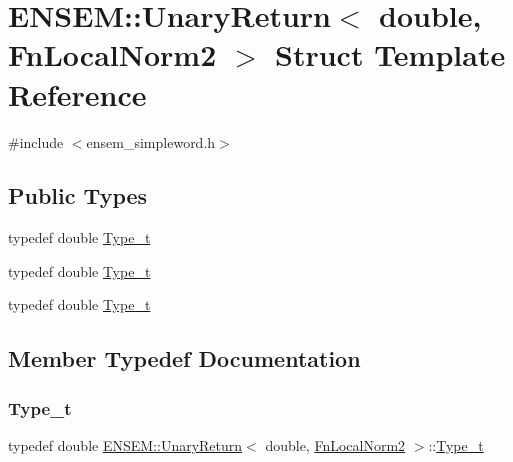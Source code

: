 \hypertarget{structENSEM_1_1UnaryReturn_3_01double_00_01FnLocalNorm2_01_4}{}\section{E\+N\+S\+EM\+:\+:Unary\+Return$<$ double, Fn\+Local\+Norm2 $>$ Struct Template Reference}
\label{structENSEM_1_1UnaryReturn_3_01double_00_01FnLocalNorm2_01_4}


{\ttfamily \#include $<$ensem\+\_\+simpleword.\+h$>$}

\subsection*{Public Types}
\begin{DoxyCompactItemize}
\item 
typedef double \mbox{\hyperlink{structENSEM_1_1UnaryReturn_3_01double_00_01FnLocalNorm2_01_4_aeffdb3ddbb9a4422627961295ff3ee26}{Type\+\_\+t}}
\item 
typedef double \mbox{\hyperlink{structENSEM_1_1UnaryReturn_3_01double_00_01FnLocalNorm2_01_4_aeffdb3ddbb9a4422627961295ff3ee26}{Type\+\_\+t}}
\item 
typedef double \mbox{\hyperlink{structENSEM_1_1UnaryReturn_3_01double_00_01FnLocalNorm2_01_4_aeffdb3ddbb9a4422627961295ff3ee26}{Type\+\_\+t}}
\end{DoxyCompactItemize}


\subsection{Member Typedef Documentation}
\mbox{\label{structENSEM_1_1UnaryReturn_3_01double_00_01FnLocalNorm2_01_4_aeffdb3ddbb9a4422627961295ff3ee26}} 
\subsubsection{\texorpdfstring{Type\_t}{Type\_t}\hspace{0.1cm}{\footnotesize\ttfamily [1/3]}}
{\footnotesize\ttfamily typedef double \mbox{\hyperlink{structENSEM_1_1UnaryReturn}{E\+N\+S\+E\+M\+::\+Unary\+Return}}$<$ double, \mbox{\hyperlink{structENSEM_1_1FnLocalNorm2}{Fn\+Local\+Norm2}} $>$\+::\mbox{\hyperlink{structENSEM_1_1UnaryReturn_3_01double_00_01FnLocalNorm2_01_4_aeffdb3ddbb9a4422627961295ff3ee26}{Type\+\_\+t}}}

